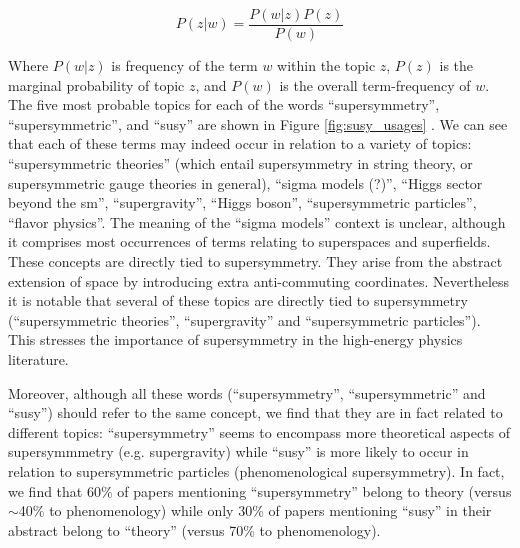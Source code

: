 \documentclass[smallextended]{svjour3}
\begin{document}
\begin{equation}
    P(z|w) = \dfrac{P(w|z)P(z)}{P(w)}
\end{equation}

Where $P(w|z)$ is frequency of the term $w$ within the topic $z$, $P(z)$ is the marginal probability of topic $z$, and $P(w)$ is the overall term-frequency of $w$. The five most probable topics for each of the words ``supersymmetry'', ``supersymmetric'', and ``susy''  are shown in Figure \ref{fig:susy_usages}%
. We can see that each of these terms may indeed occur in relation to a variety of topics: ``supersymmetric theories'' (which entail supersymmetry in string theory, or supersymmetric gauge theories in general), ``sigma models (?)'', ``Higgs sector beyond the \gls{sm}'', ``supergravity'', ``Higgs boson'', ``supersymmetric particles'', ``flavor physics''. The meaning of the ``sigma models'' context is unclear, although it comprises most occurrences of terms relating to superspaces and superfields. These concepts are directly tied to supersymmetry. They arise from the abstract extension of space by introducing extra anti-commuting coordinates. Nevertheless it is notable that several of these topics are directly tied to supersymmetry (``supersymmetric theories'', ``supergravity'' and ``supersymmetric particles''). This stresses the importance of supersymmetry in the high-energy physics literature.

Moreover, although all these words (``supersymmetry'', ``supersymmetric'' and ``susy'') should refer to the same concept, we find that they are in fact related to different topics: ``supersymmetry'' seems to encompass more theoretical aspects of supersymmmetry (e.g. supergravity) while ``susy'' is more likely to occur in relation to supersymmetric particles (phenomenological supersymmetry). In fact, we find that 60\% of papers mentioning ``supersymmetry'' belong to theory (versus $\sim$40\% to phenomenology) while only 30\% of papers mentioning ``susy'' in their abstract belong to ``theory'' (versus 70\% to phenomenology).
\begin{figure*}
    \centering
    
    \caption{\textbf{The many uses of supersymmetry}. For three terms $w$ refering to supersymmetry (``supersymmetric'', ``supersymmetry'', and ``susy''), the five topics $z$ that are most likely to have led to their occurrence and their respective conditional probability $P(z|w)$ are shown. ``Supersymetry'' and ``supersymmetric'' have similar distributions, and mostly occur within theoretical topics. ``Susy'''s topic distribution is much more peaked, and most often occurs within phenomenological topics.}
    \label{fig:susy_usages}
\end{figure*}
\end{document}
